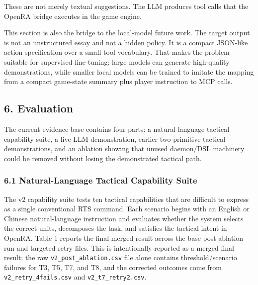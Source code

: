 \documentclass[
  journal]{IEEEtran}
\begin{document}
These are not merely textual suggestions. The LLM produces tool calls
that the OpenRA bridge executes in the game engine.

This section is also the bridge to the local-model future work. The
target output is not an unstructured essay and not a hidden policy. It
is a compact JSON-like action specification over a small tool
vocabulary. That makes the problem suitable for supervised fine-tuning:
large models can generate high-quality demonstrations, while smaller
local models can be trained to imitate the mapping from a compact
game-state summary plus player instruction to MCP calls.

\subsection{6. Evaluation}\label{evaluation}

The current evidence base contains four parts: a natural-language
tactical capability suite, a live LLM demonstration, earlier
two-primitive tactical demonstrations, and an ablation showing that
unused daemon/DSL machinery could be removed without losing the
demonstrated tactical path.

\subsubsection{6.1 Natural-Language Tactical Capability
Suite}\label{natural-language-tactical-capability-suite}

The v2 capability suite tests ten tactical capabilities that are
difficult to express as a single conventional RTS command. Each scenario
begins with an English or Chinese natural-language instruction and
evaluates whether the system selects the correct units, decomposes the
task, and satisfies the tactical intent in OpenRA. Table 1 reports the
final merged result across the base post-ablation run and targeted retry
files. This is intentionally reported as a merged final result: the raw
\texttt{v2\_post\_ablation.csv} file alone contains threshold/scenario
failures for T3, T5, T7, and T8, and the corrected outcomes come from
\texttt{v2\_retry\_4fails.csv} and \texttt{v2\_t7\_retry2.csv}.
\end{document}
